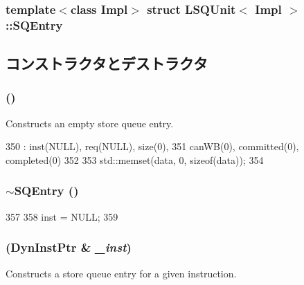 \subsubsection*{template$<$class Impl$>$ struct LSQUnit$<$ Impl $>$::SQEntry}



\subsection{コンストラクタとデストラクタ}
\hypertarget{structLSQUnit_1_1SQEntry_a3e45ad78b5babe810aa50349be32637b}{
\subsubsection[{SQEntry}]{ ()}}
\label{structLSQUnit_1_1SQEntry_a3e45ad78b5babe810aa50349be32637b}
Constructs an empty store queue entry. 


\begin{DoxyCode}
350             : inst(NULL), req(NULL), size(0),
351               canWB(0), committed(0), completed(0)
352         {
353             std::memset(data, 0, sizeof(data));
354         }
\end{DoxyCode}
\hypertarget{structLSQUnit_1_1SQEntry_af0d1628e74b0c1240075eaee424f80f8}{
\subsubsection[{$\sim$SQEntry}]{\setlength{\rightskip}{0pt plus 5cm}$\sim${\bf SQEntry} ()}}
\label{structLSQUnit_1_1SQEntry_af0d1628e74b0c1240075eaee424f80f8}



\begin{DoxyCode}
357         {
358             inst = NULL;
359         }
\end{DoxyCode}
\hypertarget{structLSQUnit_1_1SQEntry_a3b163ba1f4e957334b0fe8a659562015}{
\subsubsection[{SQEntry}]{ ({\bf DynInstPtr} \& {\em \_\-inst})}}
\label{structLSQUnit_1_1SQEntry_a3b163ba1f4e957334b0fe8a659562015}
Constructs a store queue entry for a given instruction. 


